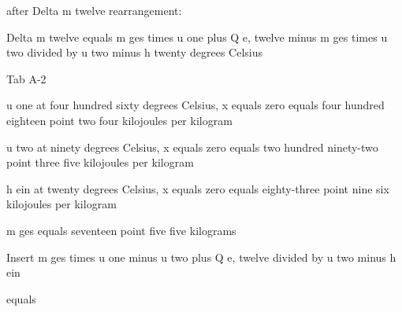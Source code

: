 after Delta m twelve rearrangement:

Delta m twelve equals m ges times u one plus Q e, twelve minus m ges times u two divided by u two minus h twenty degrees Celsius

Tab A-2

u one at four hundred sixty degrees Celsius, x equals zero equals four hundred eighteen point two four kilojoules per kilogram

u two at ninety degrees Celsius, x equals zero equals two hundred ninety-two point three five kilojoules per kilogram

h ein at twenty degrees Celsius, x equals zero equals eighty-three point nine six kilojoules per kilogram

m ges equals seventeen point five five kilograms

Insert m ges times u one minus u two plus Q e, twelve divided by u two minus h ein

equals